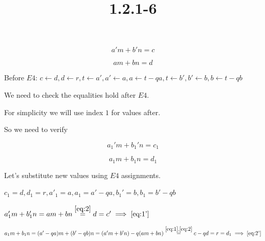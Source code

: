 \documentclass{article}
\title{1.2.1-6}
\begin{document}
\maketitle

\[a'm+b'n = c \tag{1}\label{eq:1}\]

\[am + bn = d \tag{2}\label{eq:2}\]

Before \( E4 \): \( c \leftarrow d, d \leftarrow r, t \leftarrow a', a' \leftarrow a, a \leftarrow t - qa, t \leftarrow b', b' \leftarrow b, b \leftarrow t - qb \)

We need to check the equalities hold after \( E4 \).

For simplicity we will use index \( 1 \) for values after.

So we need to verify

\[a_1'm+b_1'n = c_1 \tag{1'}\label{eq:1'}\]

\[a_1m + b_1n = d_1 \tag{2'}\label{eq:2'}\]

Let's substitute new values using \( E4 \) assignments.

\( c_1=d, d_1=r, a'_1=a,a_1=a'-qa,b_1'=b,b_1=b'-qb \)

\( a_1'm+b_1'n=am+bn\overset{\eqref{eq:2}}{=}d=c' \implies \eqref{eq:1'} \)

\( a_1m+b_1n=(a'-qa)m+(b'-qb)n=(a'm+b'n)-q(am+bn)\overset{\eqref{eq:1}, \eqref{eq:2}}{=}c-qd = r = d_1 \implies \eqref{eq:2'} \)
\end{document}
